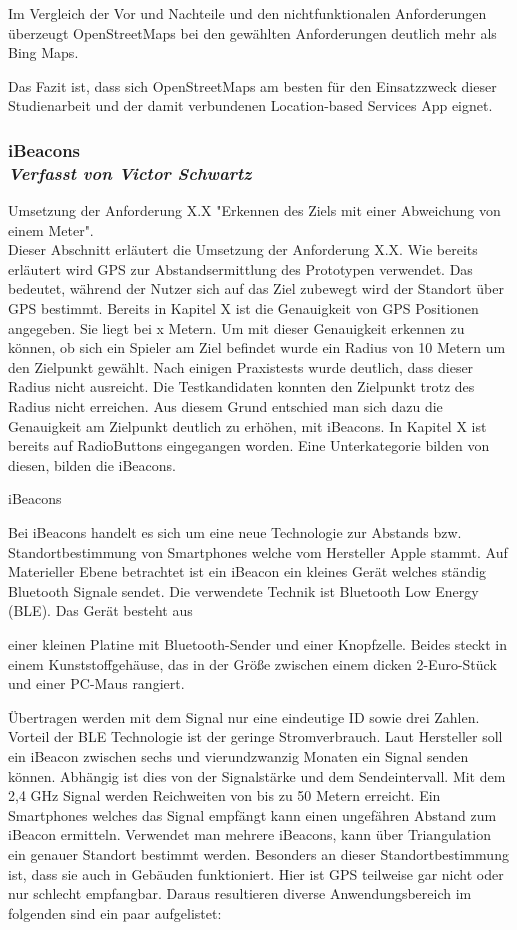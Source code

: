 Im Vergleich der Vor und Nachteile und den nichtfunktionalen Anforderungen überzeugt OpenStreetMaps bei den gewählten Anforderungen deutlich mehr als Bing Maps.

Das Fazit ist, dass sich OpenStreetMaps am besten für den Einsatzzweck dieser Studienarbeit und der damit verbundenen Location-based Services App eignet.

\subsubsection[iBeacons]{iBeacons
 \\ \textnormal{\small{\textit {Verfasst von Victor Schwartz}}}}

Umsetzung der Anforderung X.X "Erkennen des Ziels mit einer Abweichung von einem Meter".
\\Dieser Abschnitt erläutert die Umsetzung der Anforderung X.X. Wie bereits erläutert wird GPS zur Abstandsermittlung des Prototypen verwendet. Das bedeutet, während der Nutzer sich auf das Ziel zubewegt wird der Standort über GPS bestimmt. Bereits in Kapitel X ist die Genauigkeit von GPS Positionen angegeben.  Sie liegt bei x Metern. Um mit dieser Genauigkeit erkennen zu können, ob sich ein Spieler am Ziel befindet wurde ein Radius von 10 Metern um den Zielpunkt gewählt. Nach einigen Praxistests wurde deutlich, dass dieser Radius nicht ausreicht. Die Testkandidaten konnten den Zielpunkt trotz des Radius nicht erreichen. Aus diesem Grund entschied man sich dazu die Genauigkeit am Zielpunkt deutlich zu erhöhen, mit iBeacons. In Kapitel X ist bereits auf RadioButtons eingegangen worden. Eine Unterkategorie bilden von diesen, bilden die iBeacons.

iBeacons

Bei iBeacons handelt es sich um eine neue Technologie zur Abstands bzw. Standortbestimmung von Smartphones welche vom Hersteller Apple stammt. Auf Materieller Ebene betrachtet ist ein iBeacon ein kleines Gerät welches ständig Bluetooth Signale sendet. Die verwendete Technik ist Bluetooth Low Energy (BLE). Das Gerät besteht aus

\glqq einer kleinen Platine mit Bluetooth-Sender und einer Knopfzelle. Beides steckt in einem Kunststoffgehäuse, das in der Größe zwischen einem dicken 2-Euro-Stück und einer PC-Maus rangiert.\grqq
\cite{BeaconGolem}

Übertragen werden mit dem Signal nur eine eindeutige ID sowie drei Zahlen. Vorteil der BLE Technologie ist der geringe Stromverbrauch. Laut Hersteller soll ein iBeacon zwischen sechs und vierundzwanzig Monaten ein Signal senden können. Abhängig ist dies von der Signalstärke und dem Sendeintervall. Mit dem 2,4 GHz Signal werden Reichweiten von bis zu 50 Metern erreicht. Ein Smartphones welches das Signal empfängt kann einen ungefähren Abstand zum iBeacon ermitteln. Verwendet man mehrere iBeacons, kann über Triangulation ein genauer Standort bestimmt werden. Besonders an dieser Standortbestimmung ist, dass sie auch in Gebäuden funktioniert. Hier ist GPS teilweise gar nicht oder nur schlecht empfangbar. Daraus resultieren diverse Anwendungsbereich im folgenden sind ein paar aufgelistet:

